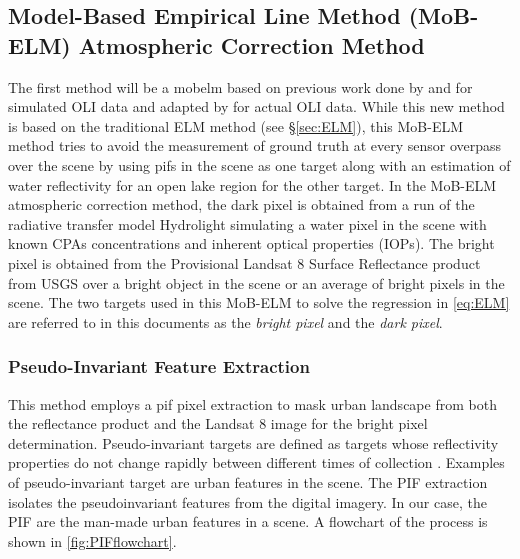 \subsection{Model-Based Empirical Line Method (MoB-ELM) Atmospheric Correction Method}

The first method will be a \gls{mobelm} based on previous work done by \cite{Gerace:2013} and \cite{Gerace:2012}  for simulated OLI data and adapted by \cite{Concha2014SPIE} for actual OLI data. While this new method is based on the traditional ELM method (see \S\ref{sec:ELM}), this MoB-ELM method tries to avoid the measurement of ground truth at every sensor overpass over the scene by using \glspl{pif} in the scene as one target along with an estimation of water reflectivity for an open lake region for the other target. In the MoB-ELM atmospheric correction method, the dark pixel is obtained from a run of the radiative transfer model Hydrolight \cite{MobleyHEtech} simulating a water pixel in the scene with known CPAs concentrations and inherent optical properties (IOPs). The bright pixel is obtained from the Provisional Landsat 8 Surface Reflectance product \cite{L8SurfProduct2015} from USGS over a bright object in the scene or an average of bright pixels in the scene. The two targets used in this MoB-ELM to solve the regression in \autoref{eq:ELM} are referred to in this documents as the {\it bright pixel}  and the {\it dark pixel}.

\subsubsection{Pseudo-Invariant Feature Extraction}

This method employs a \gls{pif} pixel extraction to mask urban landscape from both the reflectance product and the Landsat 8 image for the bright pixel determination. Pseudo-invariant targets are defined as targets whose reflectivity properties do not change rapidly between different times of collection  \cite{Schott:1988}. Examples of pseudo-invariant target are urban features in the scene.  The PIF extraction isolates the pseudoinvariant features from the digital imagery. In our case, the PIF are the man-made urban features in a scene. A flowchart of the process is shown in \autoref{fig:PIFflowchart}. 

